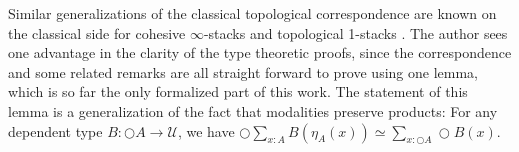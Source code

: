 \documentclass[9pt,twosided]{amsart}
\begin{document}
Similar generalizations of the classical topological correspondence are known on the classical side
for cohesive $\infty$-stacks \cite[Section 5.2.7]{SchreiberDcct} and topological 1-stacks \cite{noohi}.     
The author sees one advantage in the clarity of the type theoretic proofs,
since the correspondence and some related remarks are all straight forward to prove using one lemma,
which is so far the only formalized part of this work.
The statement of this lemma is a generalization of the fact that modalities preserve products:
For any dependent type $B:\bigcirc A \to \mathcal U$, we have $\bigcirc \sum_{x:A}B(\eta_A(x)) \simeq \sum_{x:\bigcirc A}\bigcirc B(x)$.

\printbibliography
\end{document}

